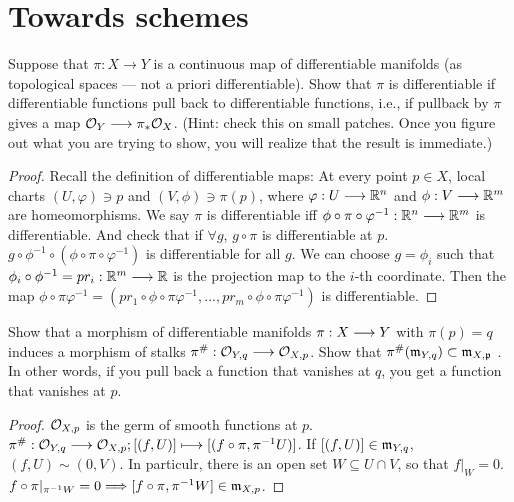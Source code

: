 \documentclass[11pt,fleqn]{book}
\begin{document}
\section{Towards schemes}
\begin{exr}
Suppose that $\pi: X\longrightarrow Y$ is a continuous map of differentiable manifolds (as topological spaces — not a priori differentiable). Show that $\pi$ is differentiable if differentiable functions pull back to differentiable functions, i.e., if pullback by $\pi$ gives a map ${\cal O}_Y \longrightarrow \pi_*{\cal O}_X$. (Hint: check this on small patches. Once you figure out what you are trying to show, you will realize that the result is immediate.)
\end{exr}
\begin{proof}
Recall the definition of differentiable maps: At every point $p\in X$, local charts $(U,\varphi)\ni p$ and $(V,\phi)\ni \pi(p)$, where $\varphi: U\longrightarrow \mathbb R^n$ and $\phi:V\longrightarrow \mathbb R^m$ are homeomorphisms. We say $\pi$ is differentiable iff $\phi\circ\pi\circ\varphi^{-1}:\mathbb R^n\longrightarrow \mathbb R^m$ is differentiable. And check that if $\forall g$, $g\circ \pi$ is differentiable at $p$. $g\circ \phi^{-1}\circ(\phi\circ \pi\circ \varphi^{-1})$ is differentiable for all $g$. We can choose $g=\phi_i$ such that $\phi_i\circ \phi^{-1}=pr_i:\mathbb R^m\longrightarrow\mathbb R$ is the projection map to the $i$-th coordinate. Then the map $\phi\circ\pi\varphi^{-1}=(pr_1\circ\phi\circ\pi\varphi^{-1},...,pr_m\circ\phi\circ\pi\varphi^{-1})$ is differentiable.
\end{proof}

\begin{exr}
Show that a morphism of differentiable manifolds $\pi: X\longrightarrow Y$ with $\pi(p)=q$ induces a morphism of stalks $\pi^\#:{\cal O}_{Y,q}\longrightarrow {\cal O}_{X,p}$. Show that $\pi^\# ({\mathfrak m}_{Y,q})\subset {\mathfrak m}_{X,{\mathfrak p}}$ . In other words, if you pull back a function that vanishes at $q$, you get a function that vanishes at $p$. 
\end{exr}
\begin{proof}
${\cal O}_{X,p}$ is the germ of smooth functions at $p$. $\pi^{\#}:{\cal O}_{Y,q}\longrightarrow {\cal O}_{X,p}; [(f,U)]\longmapsto [(f\circ \pi, \pi^{-1} U)]$. If $[(f,U)]\in {\mathfrak m}_{Y,q}$, $(f,U)\sim (0, V) $. In particulr, there is an open set $W\subseteq U\cap V$, so that $f|_W=0$. $f\circ\pi|_{\pi^{-1}W}=0\Longrightarrow [f\circ\pi, \pi^{-1}W]\in {\mathfrak m}_{X,p}$.
\end{proof}
\end{document}
